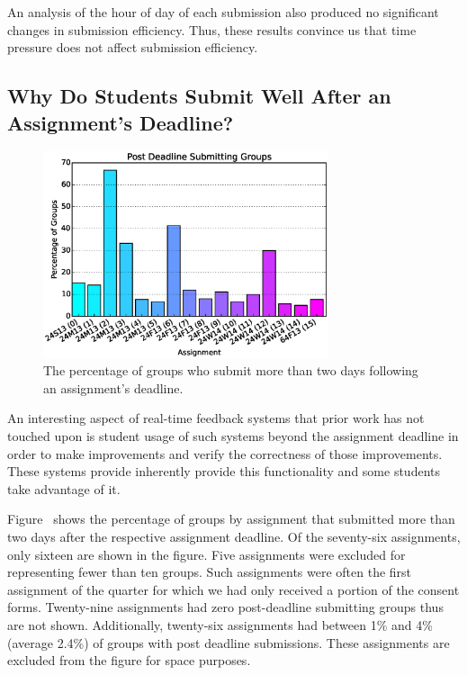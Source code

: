 An analysis of the hour of day of each submission also produced no significant
changes in submission efficiency. Thus, these results convince us that time
pressure does not affect submission efficiency.

\subsection{Why Do Students Submit Well After an Assignment's Deadline?}

\begin{figure}[!t]
\centering \includegraphics[width=3.3in]{graphs/Post_Deadline_Submitting_Groups.eps}
\caption{The percentage of groups who submit more than two days following an
  assignment's deadline.}
\end{figure}

An interesting aspect of real-time feedback systems that prior work has not
touched upon is student usage of such systems beyond the assignment deadline in
order to make improvements and verify the correctness of those
improvements. These systems provide inherently provide this functionality and
some students take advantage of it.

Figure~ shows the percentage of groups by assignment that
submitted more than two days after the respective assignment deadline. Of the
seventy-six assignments, only sixteen are shown in the figure. Five assignments
were excluded for representing fewer than ten groups. Such assignments were
often the first assignment of the quarter for which we had only received a
portion of the consent forms. Twenty-nine assignments had zero post-deadline
submitting groups thus are not shown. Additionally, twenty-six assignments had
between 1\% and 4\% (average 2.4\%) of groups with post deadline
submissions. These assignments are excluded from the figure for space purposes.

